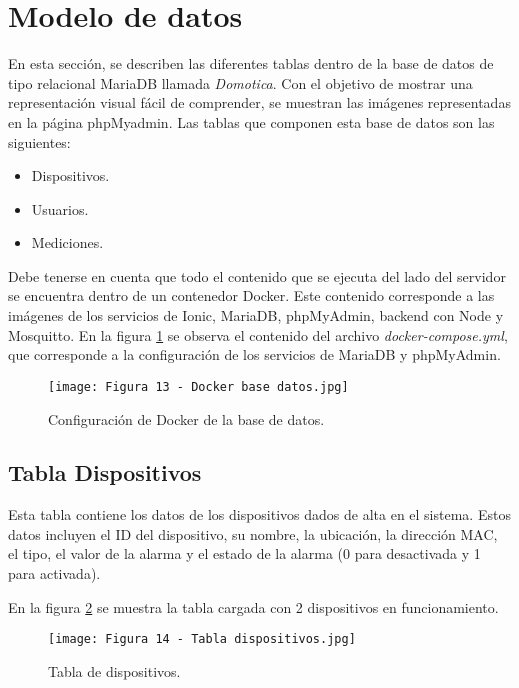 \section{Modelo de datos}

En esta sección, se describen las diferentes tablas dentro de la base de datos de tipo relacional MariaDB llamada \textit{Domotica}. Con el objetivo de mostrar una representación visual fácil de comprender, se muestran las imágenes representadas en la página phpMyadmin. Las tablas que componen esta base de datos son las siguientes:

\begin{itemize}
	\item Dispositivos.
	\item Usuarios.
	\item Mediciones.
\end{itemize}

Debe tenerse en cuenta que todo el contenido que se ejecuta del lado del servidor se encuentra dentro de un contenedor Docker. Este contenido corresponde a las imágenes de los servicios de Ionic, MariaDB, phpMyAdmin, backend con Node y Mosquitto. En la figura \ref{fig:13} se observa el contenido del archivo \textit{docker-compose.yml}, que corresponde a la configuración de los servicios de MariaDB y phpMyAdmin.

\newpage
\begin{figure}[h]
\centering
\texttt{[image: Figura 13 - Docker base datos.jpg]}
\caption[Configuración de Docker de la base de datos]{Configuración de Docker de la base de datos.}
\label{fig:13}
\end{figure}

\subsection{Tabla Dispositivos}

Esta tabla contiene los datos de los dispositivos dados de alta en el sistema. Estos datos incluyen el ID del dispositivo, su nombre, la ubicación, la dirección MAC, el tipo, el valor de la alarma y el estado de la alarma (0 para desactivada y 1 para activada).

En la figura \ref{fig:14} se muestra la tabla cargada con 2 dispositivos en funcionamiento.

\begin{figure}[h]
\centering
\texttt{[image: Figura 14 - Tabla dispositivos.jpg]}
\caption[Tabla de dispositivos]{Tabla de dispositivos.}
\label{fig:14}
\end{figure}

